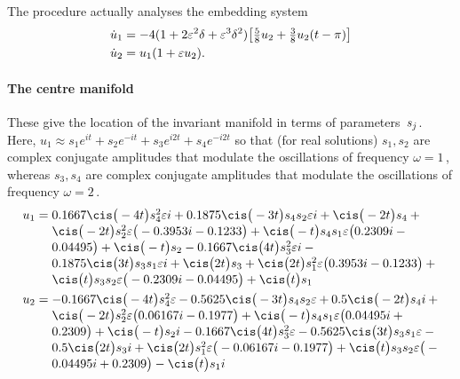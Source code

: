 The procedure actually analyses the embedding system
\begin{align*}&
\dot u_{1}=-4(1+2\varepsilon^2\delta+\varepsilon^3\delta^2)\big[\tfrac58u_2+\tfrac38u_2(t-\pi)\big]
\\&
\dot u_{2}= u_1(1+ \varepsilon u_2).
\end{align*}

\paragraph{The centre manifold} 
These give the location of the invariant manifold in
terms of parameters~\(s\sb j\).
Here, \(u_1\approx s_1e^{it}+s_2e^{-it}+s_3e^{i2t}+s_4e^{-i2t}\) so that (for real solutions) \(s_1,s_2\) are complex conjugate amplitudes that modulate the oscillations of frequency \(\omega=1\)\,, whereas \(s_3,s_4\) are complex conjugate amplitudes that modulate the oscillations of frequency \(\omega=2\)\,.
\begin{align*}&
u_{1}=\parbox[t]{0.9\linewidth}{\raggedright\(
0.1667 \cis\big(-4 t\big) s_{4}^{2} \eps i+0.1875 \cis\big(-3 t
\big) s_{4} s_{2} \eps i+\cis\big(-2 t\big) s_{4}
+\cis\big(-2 t\big) s_{
2}^{2} \eps \big(-0.3953 i-0.1233\big)+\cis\big(-t\big) s_{4} s_{1} 
\eps \big(0.2309 i-0.04495\big)+\cis\big(-t\big) s_{2}-0.1667 \cis
\big(4 t\big) s_{3}^{2} \eps i-0.1875 \cis\big(3 t\big) s_{3} s_{1} \eps
 i+\cis\big(2 t\big) s_{3}+\cis\big(2 t\big) s_{1}^{2} \eps \big(
0.3953 i-0.1233\big)+\cis\big(t\big) s_{3} s_{2} \eps \big(-0.2309 
i-0.04495\big)+\cis\big(t\big) s_{1}
\)}
\\&
u_{2}=\parbox[t]{0.9\linewidth}{\raggedright\(
-0.1667 \cis\big(-4 t\big) s_{4}^{2} \eps-0.5625 \cis\big(-3 t
\big) s_{4} s_{2} \eps+0.5 \cis\big(-2 t\big) s_{4} i
+\cis\big(-2 t\big)
 s_{2}^{2} \eps \big(0.06167 i-0.1977\big)+\cis\big(-t\big) s_{4} s_
{1} \eps \big(0.04495 i+0.2309\big)+\cis\big(-t\big) s_{2} i-
0.1667 \cis\big(4 t\big) s_{3}^{2} \eps-0.5625 \cis\big(3 t\big) s_{3}
 s_{1} \eps-0.5 \cis\big(2 t\big) s_{3} i+\cis\big(2 t\big) s_{1}^{2} 
\eps \big(-0.06167 i-0.1977\big)+\cis\big(t\big) s_{3} s_{2} \eps 
\big(-0.04495 i+0.2309\big)-\cis\big(t\big) s_{1} i
\)}
\end{align*}

 
